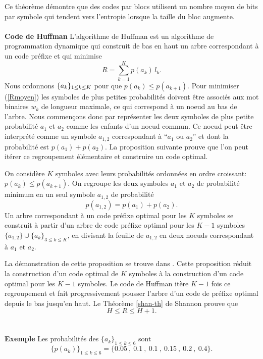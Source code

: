 Ce th\'eor\`eme d\'emontre que des codes par blocs 
utilisent un nombre moyen de bits par symbole qui tendent
vers l'entropie lorsque la taille du bloc augmente.
\\
\\
{\bf Code de Huffman}
L'algorithme de Huffman est un algorithme de programmation dynamique
qui construit de bas en haut un arbre correspondant \`a un
code pr\'efixe et qui 
minimise 
\begin{equation}
\label{Rmoyen}
R = \sum_{k=1}^K p(a_k) \, l_k .
\end{equation}
Nous ordonnons
$\{a_k \}_{ 1 \leq k \leq K}$ pour que $p(a_k) \leq p(a_{k+1})$.
Pour minimiser (\ref{Rmoyen}) 
les symboles de plus petites probabilit\'es doivent \^etre 
associ\'es aux mot binaires $w_k$ de longueur maximale, ce qui
correspond \`a un noeud au bas de l'arbre.
Nous commen\c cons donc par repr\'esenter les deux symboles de plus
petite probabilit\'e 
$a_1$ et $a_2$ comme les enfants d'un noeud commun. 
Ce noeud peut \^etre interpr\'et\'e comme un symbole
$a_{1,2}$ correspondant \`a ``$a_1$ ou $a_2$'' et
dont la probabilit\'e est
$p(a_1) + p(a_2)$. La proposition suivante prouve que
l'on peut it\'erer ce regroupement \'el\'ementaire et construire un
code optimal.

\begin{proposition} 
On consid\`ere $K$ symboles avec leurs probabilit\'es
ordonn\'ees en ordre croissant: $p(a_k) \leq p(a_{k+1})$.
On regroupe les deux symboles $a_1$ et $a_2$ de probabilit\'e
minimum en un seul symbole $a_{1,2}$ de probabilit\'e
\[
p(a_{1,2}) = p(a_1) + p(a_2) .
\]
Un arbre correspondant \`a un code pr\'efixe optimal pour
les $K$ symboles se construit \`a partir
d'un arbre de code pr\'efixe optimal pour les $K-1$ symboles
$\{a_{1,2}\} \cup \{ a_k \}_{3 \leq k \leq K}$,
en divisant la feuille de
$a_{1,2}$ en deux noeuds correspondant \`a $a_1$ et $a_2$.
\end{proposition}

La d\'emonstration de cette proposition se trouve dans 
\cite{bremaud-proba}.
Cette proposition r\'eduit la construction d'un code optimal de
$K$ symboles \`a la construction 
d'un code optimal pour les $K-1$ symboles.
Le code de Huffman it\`ere $K-1$ fois
ce regroupement et fait progressivement pousser l'arbre
d'un code de pr\'efixe optimal depuis le bas jusqu'en haut.
Le Th\'eor\`eme \ref{shan-th} de Shannon prouve que
\begin{equation}
\label{entropy-bound}
H \leq R  \leq H + 1 .
\end{equation}
\\
\\
{\bf Exemple} 
Les probabilit\'es des $\{a_k\}_{1 \leq k \leq 6}$ sont
\begin{equation}
\label{proba-code}
\{p(a_k)\}_{1 \leq k \leq 6} = \{0.05~,~0.1~,~0.1~,~0.15~,~0.2~,~0.4\}.
\end{equation}

